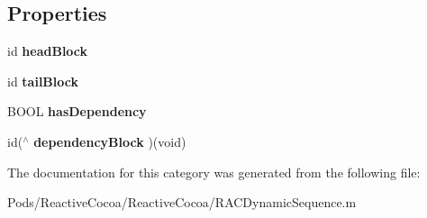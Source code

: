 \subsection*{Properties}
\begin{DoxyCompactItemize}
\item 
\mbox{\label{category_r_a_c_dynamic_sequence_07_08_a445e10a32e21d5589a88a3565311c84e}} 
id {\bfseries head\+Block}
\item 
\mbox{\label{category_r_a_c_dynamic_sequence_07_08_a197edc42c1244ecf96512536dcd9d255}} 
id {\bfseries tail\+Block}
\item 
\mbox{\label{category_r_a_c_dynamic_sequence_07_08_ab1b915c3e444838bfcac59394c9997da}} 
B\+O\+OL {\bfseries has\+Dependency}
\item 
\mbox{\label{category_r_a_c_dynamic_sequence_07_08_ae3b6a04f2ce0564826ea6a5fce58f9d6}} 
id($^\wedge$ {\bfseries dependency\+Block} )(void)
\end{DoxyCompactItemize}


The documentation for this category was generated from the following file\+:\begin{DoxyCompactItemize}
\item 
Pods/\+Reactive\+Cocoa/\+Reactive\+Cocoa/R\+A\+C\+Dynamic\+Sequence.\+m\end{DoxyCompactItemize}
